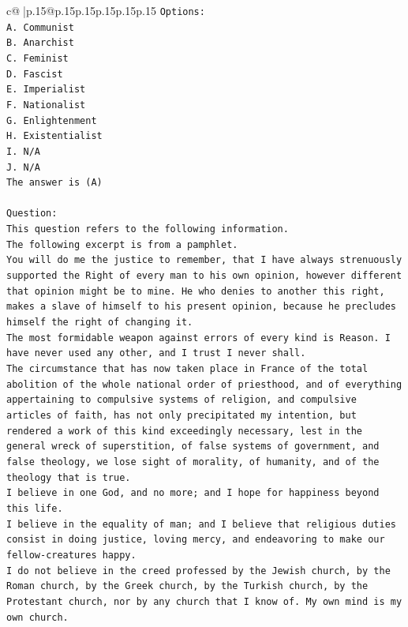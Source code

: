 \documentclass{article}
\begin{document}
{\begin{supertabular}{c@{$\;$}|p{.15\linewidth}@{}p{.15\linewidth}p{.15\linewidth}p{.15\linewidth}p{.15\linewidth}p{.15\linewidth}}
{{{\texttt{Options:} \\
\texttt{A. Communist} \\
\texttt{B. Anarchist} \\
\texttt{C. Feminist} \\
\texttt{D. Fascist} \\
\texttt{E. Imperialist} \\
\texttt{F. Nationalist} \\
\texttt{G. Enlightenment} \\
\texttt{H. Existentialist} \\
\texttt{I. N/A} \\
\texttt{J. N/A} \\
\texttt{The answer is (A)} \\
\\ 
\texttt{Question:} \\
\texttt{This question refers to the following information.} \\
\texttt{The following excerpt is from a pamphlet.} \\
\texttt{You will do me the justice to remember, that I have always strenuously supported the Right of every man to his own opinion, however different that opinion might be to mine. He who denies to another this right, makes a slave of himself to his present opinion, because he precludes himself the right of changing it.} \\
\texttt{The most formidable weapon against errors of every kind is Reason. I have never used any other, and I trust I never shall.} \\
\texttt{The circumstance that has now taken place in France of the total abolition of the whole national order of priesthood, and of everything appertaining to compulsive systems of religion, and compulsive articles of faith, has not only precipitated my intention, but rendered a work of this kind exceedingly necessary, lest in the general wreck of superstition, of false systems of government, and false theology, we lose sight of morality, of humanity, and of the theology that is true.} \\
\texttt{I believe in one God, and no more; and I hope for happiness beyond this life.} \\
\texttt{I believe in the equality of man; and I believe that religious duties consist in doing justice, loving mercy, and endeavoring to make our fellow{-}creatures happy.} \\
\texttt{I do not believe in the creed professed by the Jewish church, by the Roman church, by the Greek church, by the Turkish church, by the Protestant church, nor by any church that I know of. My own mind is my own church.} \\
}}}
\end{supertabular}}
\end{document}
